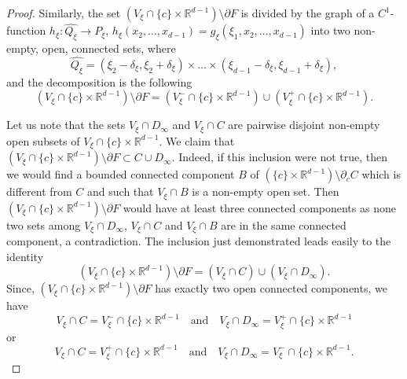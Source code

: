 \documentclass[10pt,leqno]{amsart}
\theoremstyle{definition}
\newcommand{\R}{\mathbb R}
\begin{document}
\begin{proof}
Similarly, the set $(V_\xi\cap\{c\}\times\R^{d-1})\setminus\partial F$ is divided by the graph of a $C^1$-function $h_\xi\colon \widehat{Q_\xi}\to P_\xi$, $h_\xi(x_2,\ldots,x_{d-1})=g_\xi(\xi_1,x_2,\ldots,x_{d-1})$ into two non-empty, open, connected sets, where
$$\widehat{Q_\xi}=(\xi_2-\delta_\xi,\xi_2+\delta_\xi)\times\ldots\times(\xi_{d-1}-\delta_\xi,\xi_{d-1}+\delta_\xi),$$
and the decomposition is the following
$$(V_\xi\cap\{c\}\times\R^{d-1})\setminus\partial F=
(V_\xi^-\cap\{c\}\times\R^{d-1})\cup (V_\xi^+\cap\{c\}\times\R^{d-1}).$$

Let us note that the sets $V_\xi\cap D_\infty$ and $V_\xi\cap C$ are pairwise disjoint non-empty open subsets of $V_\xi\cap\{c\}\times\R^{d-1}$. 
We claim that $(V_\xi\cap\{c\}\times\R^{d-1})\setminus\partial F\subset C\cup D_\infty$. Indeed, if this inclusion were not true, then we would find a bounded connected component $B$ of $\left(\{c\}\times\R^{d-1}\right)\setminus \partial_c C$ which is different from $C$ and such that 
$V_\xi\cap B$ is a non-empty open set. Then $(V_\xi\cap\{c\}\times\R^{d-1})\setminus\partial F$ would have at least three connected components as none two sets among $V_\xi\cap D_\infty$, $V_\xi\cap C$ and $V_\xi\cap B$ are in the same connected component, a contradiction. The inclusion just demonstrated leads easily to the identity  
$$(V_\xi\cap\{c\}\times\R^{d-1})\setminus\partial F=(V_\xi\cap C)\cup (V_\xi\cap D_\infty).$$
Since, $(V_\xi\cap\{c\}\times\R^{d-1})\setminus\partial F$ has exactly two open connected components, we have
$$V_\xi\cap C=V_\xi^-\cap\{c\}\times\R^{d-1}\quad\text{and}\quad V_\xi\cap D_\infty=V_\xi^+\cap\{c\}\times\R^{d-1}$$ 
or 
$$V_\xi\cap C=V_\xi^+\cap\{c\}\times\R^{d-1}\quad\text{and}\quad V_\xi\cap D_\infty=V_\xi^-\cap\{c\}\times\R^{d-1}.$$ 


\end{proof}
\end{document}
